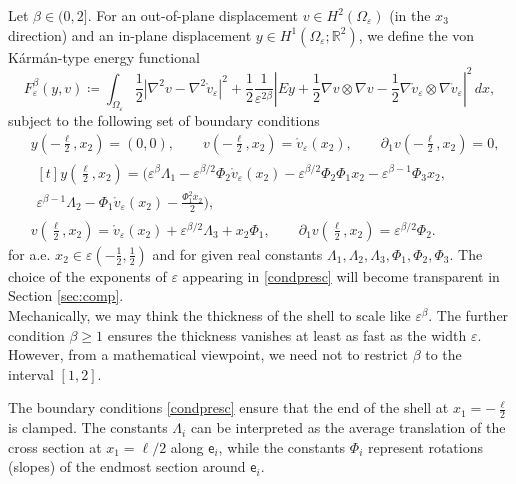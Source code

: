 \documentclass[a4, 11pt, reqno, final]{amsart}
\newcommand{\bbR}{\mathbb{R}}
\newcommand\e{\varepsilon}
\theoremstyle{plain}%
\begin{document}
	Let $\beta \in (0, 2]$. For an out-of-plane displacement $v \in H^2(\Omega_\e)$ (in the $x_3$ direction) and an in-plane displacement $y \in H^1(\Omega_\e; \bbR^2)$, we define the von Kármán-type energy functional
	\begin{equation}\label{Ie}
		F_\e^\beta(y,v) \coloneqq \int_{\Omega_\e} \frac{1}{2}|\nabla^2 v - \nabla^2 \mathring{v}_\e|^2 + \frac{1}{2} \frac{1}{\e^{2\beta}} \left|Ey + \frac{1}{2} \nabla v \otimes \nabla v - \frac{1}{2} \nabla \mathring{v}_\e \otimes \nabla \mathring{v}_\e \right|^2 \, dx,
	\end{equation}
	subject to the following set of boundary conditions
	\begin{equation}\label{condpresc}
		\begin{aligned}
			& y(-\frac{\ell}{2}, x_2) = (0,0), \qquad v(-\frac{\ell}{2}, x_2) = \mathring{v}_\e(x_2), \qquad \partial_1 v(-\frac{\ell}{2}, x_2)=0, \\
			&\begin{multlined}[t]y(\frac{\ell}{2}, x_2) =
			(\e^\beta\Lambda_1 -\e^{\beta/2}\Phi_2\mathring{v}_\e(x_2) -\e^{\beta/2} \Phi_2\Phi_1 x_2 - \e^{\beta-1}\Phi_3 x_2, \\   \e^{\beta-1} \Lambda_2 - \Phi_1\mathring{v}_\e(x_2) -\frac{\Phi_1^2 x_2}{2}),\end{multlined}\\
			&v(\frac{\ell}{2}, x_2) = \mathring{v}_\e(x_2) + \e^{\beta/2} \Lambda_3 + x_2 \Phi_1, \qquad   \partial_1 v(\frac{\ell}{2}, x_2)=\e^{\beta/2} \Phi_2.
		\end{aligned}
	\end{equation}
	for a.e. $x_2 \in \e(-\frac12, \frac12)$ and
	for given real constants $\Lambda_1, \Lambda_2, \Lambda_3, \Phi_1, \Phi_2, \Phi_3$.
	The choice of the exponents of $\e$ appearing in \eqref{condpresc} will become transparent in Section \ref{sec:comp}.\\
	Mechanically, we may think the thickness of the shell to scale like $\e^\beta$. The further condition $\beta \ge 1$ ensures the thickness vanishes at least as fast as the width $\e$. However, from a mathematical viewpoint, we need not to restrict $\beta$ to the interval $[1,2]$.

	The boundary conditions \eqref{condpresc} ensure that the end of the shell at $x_1 = - \frac{\ell}{2}$ is clamped. The constants $\Lambda_i$ can be interpreted as the average translation of the cross section at $x_1=\ell/2$ along $\mathsf{e}_i$, while the constants $\Phi_i$ represent rotations (slopes) of the endmost section around $\mathsf{e}_i$.
\end{document}
